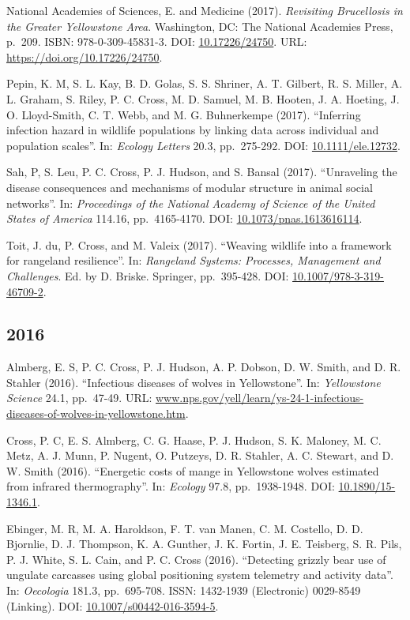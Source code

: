 \documentclass[12pt,]{article}
\begin{document}
National Academies of Sciences, E. and Medicine (2017). \emph{Revisiting
Brucellosis in the Greater Yellowstone Area}. Washington, DC: The
National Academies Press, p.~209. ISBN: 978-0-309-45831-3. DOI:
\href{https://doi.org/10.17226\%2F24750}{10.17226/24750}. URL:
\url{https://doi.org/10.17226/24750}.

Pepin, K. M, S. L. Kay, B. D. Golas, S. S. Shriner, A. T. Gilbert, R. S.
Miller, A. L. Graham, S. Riley, P. C. Cross, M. D. Samuel, M. B. Hooten,
J. A. Hoeting, J. O. Lloyd-Smith, C. T. Webb, and M. G. Buhnerkempe
(2017). ``Inferring infection hazard in wildlife populations by linking
data across individual and population scales''. In: \emph{Ecology
Letters} 20.3, pp.~275-292. DOI:
\href{https://doi.org/10.1111\%2Fele.12732}{10.1111/ele.12732}.

Sah, P, S. Leu, P. C. Cross, P. J. Hudson, and S. Bansal (2017).
``Unraveling the disease consequences and mechanisms of modular
structure in animal social networks''. In: \emph{Proceedings of the
National Academy of Science of the United States of America} 114.16,
pp.~4165-4170. DOI:
\href{https://doi.org/10.1073\%2Fpnas.1613616114}{10.1073/pnas.1613616114}.

Toit, J. du, P. Cross, and M. Valeix (2017). ``Weaving wildlife into a
framework for rangeland resilience''. In: \emph{Rangeland Systems:
Processes, Management and Challenges}. Ed. by D. Briske. Springer,
pp.~395-428. DOI:
\href{https://doi.org/10.1007\%2F978-3-319-46709-2}{10.1007/978-3-319-46709-2}.

\hypertarget{section-3}{%
\subsection{2016}\label{section-3}}

Almberg, E. S, P. C. Cross, P. J. Hudson, A. P. Dobson, D. W. Smith, and
D. R. Stahler (2016). ``Infectious diseases of wolves in Yellowstone''.
In: \emph{Yellowstone Science} 24.1, pp.~47-49. URL:
\url{www.nps.gov/yell/learn/ys-24-1-infectious-diseases-of-wolves-in-yellowstone.htm}.

Cross, P. C, E. S. Almberg, C. G. Haase, P. J. Hudson, S. K. Maloney, M.
C. Metz, A. J. Munn, P. Nugent, O. Putzeys, D. R. Stahler, A. C.
Stewart, and D. W. Smith (2016). ``Energetic costs of mange in
Yellowstone wolves estimated from infrared thermography''. In:
\emph{Ecology} 97.8, pp.~1938-1948. DOI:
\href{https://doi.org/10.1890\%2F15-1346.1}{10.1890/15-1346.1}.

Ebinger, M. R, M. A. Haroldson, F. T. van Manen, C. M. Costello, D. D.
Bjornlie, D. J. Thompson, K. A. Gunther, J. K. Fortin, J. E. Teisberg,
S. R. Pils, P. J. White, S. L. Cain, and P. C. Cross (2016). ``Detecting
grizzly bear use of ungulate carcasses using global positioning system
telemetry and activity data''. In: \emph{Oecologia} 181.3, pp.~695-708.
ISSN: 1432-1939 (Electronic) 0029-8549 (Linking). DOI:
\href{https://doi.org/10.1007\%2Fs00442-016-3594-5}{10.1007/s00442-016-3594-5}.
\end{document}
